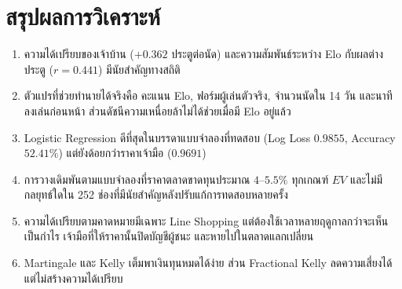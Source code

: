 \section{สรุปผลการวิเคราะห์}

\begin{enumerate}[label=\arabic*)]
    \item ความได้เปรียบของเจ้าบ้าน ($+0.362$ ประตูต่อนัด) และความสัมพันธ์ระหว่าง Elo กับผลต่างประตู ($r = 0.441$) มีนัยสำคัญทางสถิติ
    \item ตัวแปรที่ช่วยทำนายได้จริงคือ คะแนน Elo, ฟอร์มผู้เล่นตัวจริง, จำนวนนัดใน 14 วัน และนาทีลงเล่นก่อนหน้า ส่วนดัชนีความเหนื่อยล้าไม่ได้ช่วยเมื่อมี Elo อยู่แล้ว
    \item Logistic Regression ดีที่สุดในบรรดาแบบจำลองที่ทดสอบ (Log Loss $0.9855$, Accuracy $52.41\%$) แต่ยังด้อยกว่าราคาเจ้ามือ ($0.9691$)
    \item การวางเดิมพันตามแบบจำลองที่ราคาตลาดขาดทุนประมาณ $4$--$5.5\%$ ทุกเกณฑ์ $EV$ และไม่มีกลยุทธ์ใดใน 252 ช่องที่มีนัยสำคัญหลังปรับแก้การทดสอบหลายครั้ง
    \item ความได้เปรียบตามคาดหมายมีเฉพาะ Line Shopping แต่ต้องใช้เวลาหลายฤดูกาลกว่าจะเห็นเป็นกำไร เจ้ามือที่ให้ราคานั้นปิดบัญชีผู้ชนะ และหายไปในตลาดแลกเปลี่ยน
    \item Martingale และ Kelly เต็มพาเงินทุนหมดได้ง่าย ส่วน Fractional Kelly ลดความเสี่ยงได้แต่ไม่สร้างความได้เปรียบ
\end{enumerate}

